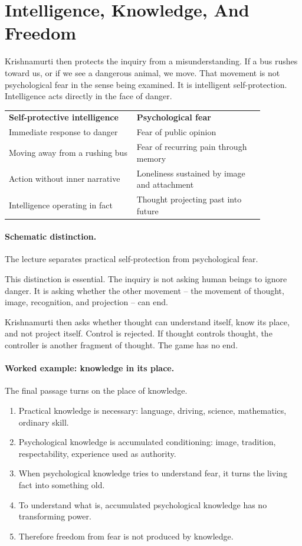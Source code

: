 \section{Intelligence, Knowledge, And Freedom}

Krishnamurti then protects the inquiry from a misunderstanding. If a bus rushes toward us, or if we see a dangerous animal, we move. That movement is not psychological fear in the sense being examined. It is intelligent self-protection. Intelligence acts directly in the face of danger.

\begin{table}
\centering
\begin{tabular}{p{0.43\linewidth}p{0.43\linewidth}}
\textbf{Self-protective intelligence} & \textbf{Psychological fear} \\
Immediate response to danger & Fear of public opinion \\
Moving away from a rushing bus & Fear of recurring pain through memory \\
Action without inner narrative & Loneliness sustained by image and attachment \\
Intelligence operating in fact & Thought projecting past into future \\
\end{tabular}

\paragraph{Schematic distinction.}
The lecture separates practical self-protection from psychological fear.
\end{table}

This distinction is essential. The inquiry is not asking human beings to ignore danger. It is asking whether the other movement -- the movement of thought, image, recognition, and projection -- can end.

Krishnamurti then asks whether thought can understand itself, know its place, and not project itself. Control is rejected. If thought controls thought, the controller is another fragment of thought. The game has no end.

\paragraph{Worked example: knowledge in its place.}
The final passage turns on the place of knowledge.

\begin{enumerate}
\item Practical knowledge is necessary: language, driving, science, mathematics, ordinary skill.
\item Psychological knowledge is accumulated conditioning: image, tradition, respectability, experience used as authority.
\item When psychological knowledge tries to understand fear, it turns the living fact into something old.
\item To understand what is, accumulated psychological knowledge has no transforming power.
\item Therefore freedom from fear is not produced by knowledge.
\end{enumerate}

